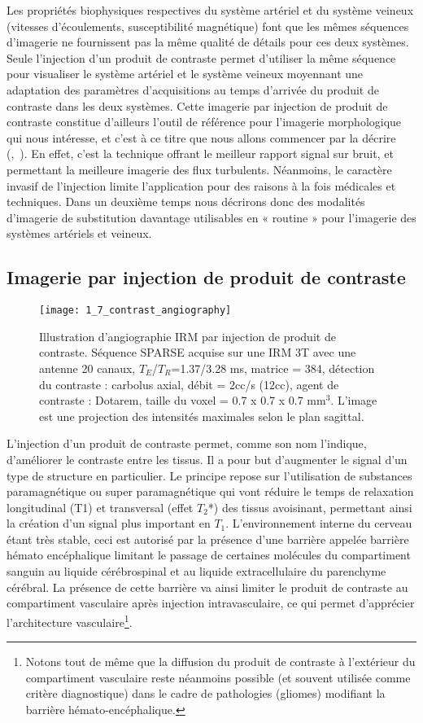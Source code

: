 Les propriétés biophysiques respectives du système artériel et du système veineux (vitesses d’écoulements, susceptibilité magnétique) font que les mêmes séquences d’imagerie ne fournissent pas la même qualité de détails pour ces deux systèmes. Seule l’injection d’un produit de contraste permet d’utiliser la même séquence pour visualiser le système artériel et le système veineux moyennant une adaptation des paramètres d’acquisitions au temps d’arrivée du produit de contraste dans les deux systèmes. Cette imagerie par injection de produit de contraste constitue d’ailleurs l’outil de référence pour l’imagerie morphologique qui nous intéresse, et c’est à ce titre que nous allons commencer par la décrire (\cite{Takano1999},~\cite{Sohn2003}). En effet, c’est la technique offrant le meilleur rapport signal sur bruit, et permettant la meilleure imagerie des flux turbulents. Néanmoins, le caractère invasif de l’injection limite l’application pour des raisons à la fois médicales et techniques. Dans un deuxième temps nous décrirons donc des modalités d’imagerie de substitution davantage utilisables en « routine » pour l’imagerie des systèmes artériels et veineux.
\subsection{Imagerie par injection de produit de contraste}
\begin{figure}[!t]
\centering
\texttt{[image: 1\_7\_contrast\_angiography]}
\caption{Illustration d'angiographie IRM par injection de produit de contraste. Séquence SPARSE acquise sur une IRM 3T avec une antenne 20 canaux, $T_E$/$T_R$=1.37/3.28 ms, matrice = 384, détection du contraste : carbolus axial, débit = 2cc/s (12cc), agent de contraste : Dotarem, taille du voxel = 0.7 x 0.7 x 0.7 mm$^3$. L'image est une projection des intensités maximales selon le plan sagittal. }
\label{fig:1_7_contrast_angiography}	
\end{figure}
L’injection d’un produit de contraste permet, comme son nom l’indique, d’améliorer le contraste entre les tissus. Il a pour but d’augmenter le signal d’un type de structure en particulier. Le principe repose sur l’utilisation de substances paramagnétique ou super paramagnétique qui vont réduire le temps de relaxation longitudinal (T1) et transversal (effet $T_2$*) des tissus avoisinant, permettant ainsi la création d’un signal plus important en $T_1$. L’environnement interne du cerveau étant très stable, ceci est autorisé par la présence d’une barrière appelée barrière hémato encéphalique limitant le passage de certaines molécules du compartiment sanguin au liquide cérébrospinal et au liquide extracellulaire du parenchyme cérébral. La présence de cette barrière va ainsi limiter le produit de contraste au compartiment vasculaire après injection intravasculaire, ce qui permet d’apprécier l’architecture vasculaire\footnote{Notons tout de même que la diffusion du produit de contraste à l’extérieur du compartiment vasculaire reste néanmoins possible (et souvent utilisée comme critère diagnostique) dans le cadre de pathologies (gliomes) modifiant la barrière hémato-encéphalique.}.

